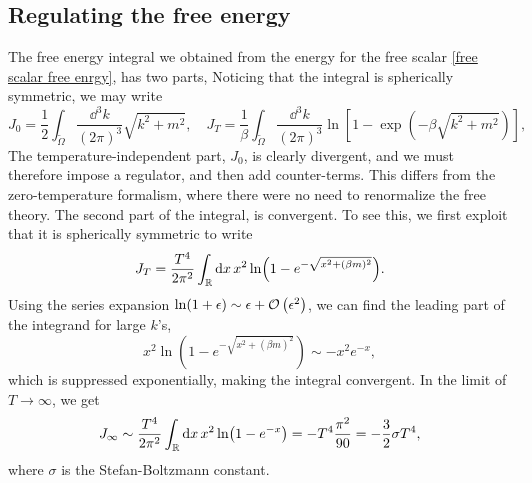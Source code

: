 \subsection{Regulating the free energy}
The free energy integral we obtained from the energy for the free scalar \autoref{free scalar free enrgy}, has two parts,
Noticing that the integral is spherically symmetric, we may write
\begin{equation}
    J_0 = \frac{1}{2} \int_{\tilde \Omega} \frac{\dd^3 k}{(2 \pi)^3} \sqrt{k^2 + m^2}, \quad
    J_T = \frac{1}{\beta} \int_{\tilde \Omega} \frac{\dd^3 k}{(2 \pi)^3} 
    \ln\left[1 - \exp(- \beta \sqrt{k^2 + m^2})\right], 
\end{equation}
The temperature-independent part, $J_0$, is clearly divergent, and we must therefore impose a regulator, and then add counter-terms.
This differs from the zero-temperature formalism, where there were no need to renormalize the free theory.
The second part of the integral, is convergent. 
To see this, we first exploit that it is spherically symmetric to write
\begin{equation}
    J_T = \frac{T^4}{2 \pi^2}\int_{\mathbb{R}} \dd x \, x^2  \ln(1 - e^{-\sqrt{x^2 + (\beta m)^2}}).
\end{equation}
Using the series expansion $\ln(1 + \epsilon) \sim \epsilon + \mathcal{O}\left(\epsilon^{2}\right)$, we can find the leading part of the  integrand for large $k$'s, 
\begin{equation}
    x^2 \ln(1 - e^{-\sqrt{x^2 + (\beta m)^2}}) \sim - x^2 e^{-x}, 
\end{equation}
which is suppressed exponentially, making the integral convergent.
In the limit of $T \rightarrow \infty$, we get
\begin{equation}
    J_\infty \sim \frac{T^4}{2 \pi^2} \int_{\mathbb{R}} \dd x \, x^2 \ln(1 - e^{-x})
    = - T^4 \frac{\pi^2}{90} = -\frac{3}{2} \sigma T^4,
\end{equation}
where $\sigma$ is the Stefan-Boltzmann constant. 


